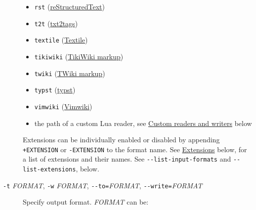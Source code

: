 \documentclass[
  a4paper,
]{article}
\begin{document}
\begin{description}
\begin{itemize}
\item
  \texttt{rst}
  (\href{https://docutils.sourceforge.io/docs/ref/rst/introduction.html}{reStructuredText})
\item
  \texttt{t2t} (\href{https://txt2tags.org}{txt2tags})
\item
  \texttt{textile} (\href{https://textile-lang.com}{Textile})
\item
  \texttt{tikiwiki}
  (\href{https://doc.tiki.org/Wiki-Syntax-Text\#The_Markup_Language_Wiki-Syntax}{TikiWiki
  markup})
\item
  \texttt{twiki}
  (\href{https://twiki.org/cgi-bin/view/TWiki/TextFormattingRules}{TWiki
  markup})
\item
  \texttt{typst} (\href{https://typst.app}{typst})
\item
  \texttt{vimwiki} (\href{https://vimwiki.github.io}{Vimwiki})
\item
  the path of a custom Lua reader, see
  \protect\hyperlink{custom-readers-and-writers}{Custom readers and
  writers} below
\end{itemize}

Extensions can be individually enabled or disabled by appending
\texttt{+EXTENSION} or \texttt{-EXTENSION} to the format name. See
\protect\hyperlink{extensions}{Extensions} below, for a list of
extensions and their names. See \texttt{-\/-list-input-formats} and
\texttt{-\/-list-extensions}, below.
\item[\texttt{-t} \emph{FORMAT}, \texttt{-w} \emph{FORMAT},
\texttt{-\/-to=}\emph{FORMAT}, \texttt{-\/-write=}\emph{FORMAT}]
Specify output format. \emph{FORMAT} can be:


\end{description}
\end{document}
